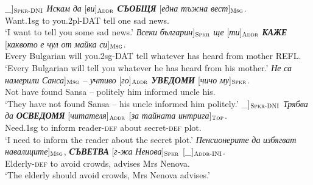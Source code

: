 \documentclass[output=paper,colorlinks,citecolor=brown]{langscibook}
\begin{document}
\largerpage
\begin{exe}
\ex \label{ex:05tellbg}
\begin{xlist}
\ex  \label{ex:05tellbg:a}
\gll  {[}\_{]}$_{\text{\textsc{Spkr-DNI}}}$ \textit{Искам} \textit{да} [\textit{ви}]$_{\text{\textsc{Addr}}}$ \textit{\textbf{СЪОБЩЯ}} [\textit{една} \textit{тъжна} \textit{вест}]$_{\text{\textsc{Msg}}}$. \\
{} Want.1sg to you.2pl-DAT tell one sad news.
\\
\glt `I want to tell you some sad news.'
\ex  \label{ex:05tellbg:b}
\gll {[}\textit{Всеки} \textit{българин}{]}$_{\text{\textsc{Spkr}}}$ \textit{ще} [\textit{ти}]$_{\text{\textsc{Addr}}}$ \textit{\textbf{КАЖЕ}} [\textit{каквото} \textit{е} \textit{чул} \textit{от} \textit{майка} \textit{си}]$_{\text{\textsc{Msg}}}$. \\
Every Bulgarian will you.2sg-DAT tell whatever has heard from mother  REFL.
\\
\glt `Every Bulgarian will tell you whatever he has heard from his mother.'
\ex  \label{ex:05tellbg:c}
\gll  {[}\textit{Не} \textit{са} \textit{намерили} \textit{Санса}{]}$_{\text{\textsc{Msg}}}$ -- \textit{учтиво} [\textit{го}]$_{\text{\textsc{Addr}}}$ \textit{\textbf{УВЕДОМИ}} [\textit{чичо} \textit{му}]$_{\text{\textsc{Spkr}}}$.\\
Not have found Sansa -- politely him informed uncle his.
\\
\glt `They have not found Sansa -- his uncle informed him politely.'
\ex  \label{ex:05tellbg:d}
\gll  {[}\_{]}$_{\text{\textsc{Spkr-DNI}}}$ \textit{Трябва} \textit{да} \textit{\textbf{ОСВЕДОМЯ}} [\textit{читателя}]$_{\text{\textsc{Addr}}}$ [\textit{за} \textit{тайната} \textit{интрига}]$_{\text{\textsc{Top}}}$.
\\
{} Need.1sg to inform reader-\textsc{def} about secret-\textsc{def} plot.
\\
\glt `I need to inform the reader about the secret plot.'
\ex  \label{ex:05tellbg:e}
\gll {[}\textit{Пенсионерите} \textit{да} \textit{избягват} \textit{навалиците}{]}$_{\text{\textsc{Msg}}}$, \textit{\textbf{СЪВЕТВА}}  [\textit{г-жа} \textit{Ненова}]$_{\text{\textsc{Spkr}}}$ [\_]$_{\text{\textsc{Addr-INI}}}$.\\
Elderly-\textsc{def} to avoid crowds,  advises  Mrs Nenova. {}
\\
\glt `The elderly should avoid crowds, Mrs Nenova advises.' 
\end{xlist}
\end{exe}
\end{document}

